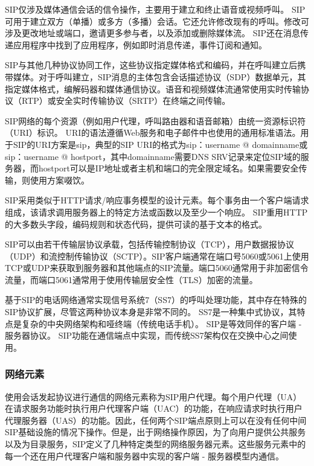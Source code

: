 \documentclass[a4paper,AutoFakeBold,oneside,12pt]{book}
\begin{document}

SIP仅涉及媒体通信会话的信令操作，主要用于建立和终止语音或视频呼叫。 SIP可用于建立双方（单播）或多方（多播）会话。它还允许修改现有的呼叫。修改可涉及更改地址或端口，邀请更多参与者，以及添加或删除媒体流。 SIP还在消息传递应用程序中找到了应用程序，例如即时消息传递，事件订阅和通知。

SIP与其他几种协议协同工作，这些协议指定媒体格式和编码，并在呼叫建立后携带媒体。对于呼叫建立，SIP消息的主体包含会话描述协议（SDP）数据单元，其指定媒体格式，编解码器和媒体通信协议。语音和视频媒体流通常使用实时传输协议（RTP）或安全实时传输协议（SRTP）在终端之间传输。

SIP网络的每个资源（例如用户代理，呼叫路由器和语音邮箱）由统一资源标识符（URI）标识。 URI的语法遵循Web服务和电子邮件中也使用的通用标准语法。用于SIP的URI方案是sip，典型的SIP URI的格式为sip：username @ domainname或sip：username @ hostport，其中domainname需要DNS SRV记录来定位SIP域的服务器，而hostport可以是IP地址或者主机和端口的完全限定域名。如果需要安全传输，则使用方案啜饮。

SIP采用类似于HTTP请求/响应事务模型的设计元素。每个事务由一个客户端请求组成，该请求调用服务器上的特定方法或函数以及至少一个响应。 SIP重用HTTP的大多数头字段，编码规则和状态代码，提供可读的基于文本的格式。

SIP可以由若干传输层协议承载，包括传输控制协议（TCP），用户数据报协议（UDP）和流控制传输协议（SCTP）。SIP客户端通常在端口号5060或5061上使用TCP或UDP来获取到服务器和其他端点的SIP流量。端口5060通常用于非加密信令流量，而端口5061通常用于使用传输层安全性（TLS）加密的流量。

基于SIP的电话网络通常实现信号系统7（SS7）的呼叫处理功能，其中存在特殊的SIP协议扩展，尽管这两种协议本身是非常不同的。 SS7是一种集中式协议，其特点是复杂的中央网络架构和哑终端（传统电话手机）。 SIP是等效同伴的客户端 - 服务器协议。 SIP功能在通信端点中实现，而传统SS7架构仅在交换中心之间使用。


\subsubsection{网络元素}
使用会话发起协议进行通信的网络元素称为SIP用户代理。每个用户代理（UA）在请求服务功能时执行用户代理客户端（UAC）的功能，在响应请求时执行用户代理服务器（UAS）的功能。因此，任何两个SIP端点原则上可以在没有任何中间SIP基础设施的情况下操作。但是，出于网络操作原因，为了向用户提供公共服务以及为目录服务，SIP定义了几种特定类型的网络服务器元素。这些服务元素中的每一个还在用户代理客户端和服务器中实现的客户端 - 服务器模型内通信。
\end{document}
